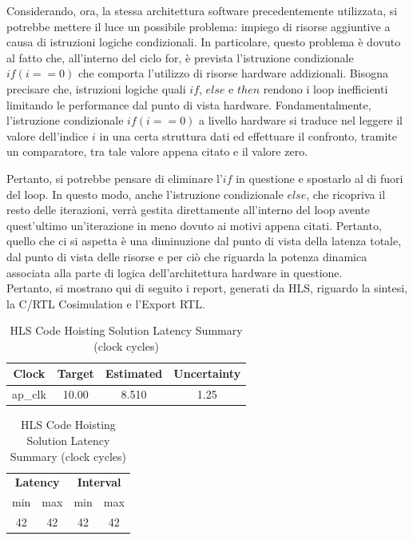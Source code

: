 Considerando, ora, la stessa architettura software precedentemente utilizzata, si potrebbe mettere il luce un possibile problema: impiego di risorse aggiuntive a causa di istruzioni logiche condizionali. In particolare, questo problema è dovuto al fatto che, all'interno del ciclo for, è prevista l'istruzione condizionale $if(i == 0)$ che comporta l'utilizzo di risorse hardware addizionali. Bisogna precisare che, istruzioni logiche quali $if$, $else$ e $then$ rendono i loop inefficienti limitando le performance dal punto di vista hardware.
Fondamentalmente, l'istruzione condizionale $if(i == 0)$ a livello hardware si traduce nel leggere il valore dell'indice $i$ in una certa struttura dati ed effettuare il confronto, tramite un comparatore, tra tale valore appena citato e il valore zero.



Pertanto, si potrebbe pensare di eliminare l'$if$ in questione e spostarlo al di fuori del loop. In questo modo, anche l'istruzione condizionale $else$, che ricopriva il resto delle iterazioni, verrà gestita direttamente all'interno del loop avente quest'ultimo un'iterazione in meno dovuto ai motivi appena citati. Pertanto, quello che ci si aspetta è una diminuzione dal punto di vista della latenza totale, dal punto di vista delle risorse e per ciò che riguarda la potenza dinamica associata alla parte di logica dell'architettura hardware in questione. 
\\
Pertanto, si mostrano qui di seguito i report, generati da HLS, riguardo la sintesi, la C/RTL Cosimulation e l'Export RTL.

\begin{table}[H]
    \centering
    \begin{minipage}[t]{0.45\linewidth}
        \centering
        \begin{tabular}{|c|c|c|c|}
            \hline
            \textbf{Clock} & \textbf{Target} & \textbf{Estimated} & \textbf{Uncertainty} \\
            \hline
            ap\_clk & 10.00 & 8.510 & 1.25 \\
            \hline
        \end{tabular}
        \caption{HLS Code Hoisting Solution Timing Summary (ns)}
        \label{tab:hls-code-hoisting-solution-timing-summary}
    \end{minipage}
    \hfill
    \begin{minipage}[t]{0.45\linewidth}
        \centering
        \begin{tabular}{|c|c|c|c|}
            \hline
            \multicolumn{2}{|c|}{\textbf{Latency}} & \multicolumn{2}{|c|}{\textbf{Interval}} \\
            min & max & min & max \\
            \hline
            42 & 42 & 42 & 42 \\
            \hline
        \end{tabular}
        \caption{HLS Code Hoisting Solution Latency Summary (clock cycles)}
        \label{tab:hls-code-hoisting-solution-latency-summary}
    \end{minipage}
\end{table}

